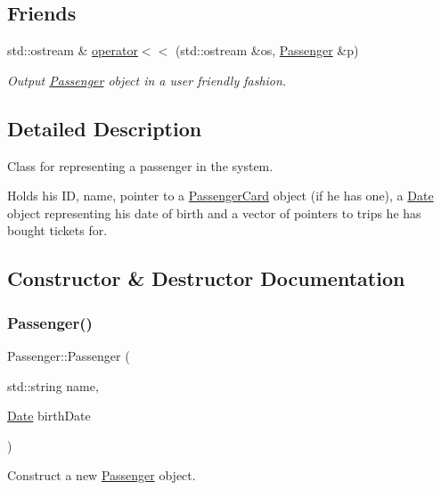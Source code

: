 \subsection*{Friends}
\begin{DoxyCompactItemize}
\item 
std\+::ostream \& \mbox{\hyperlink{classPassenger_a7b1aeaded08562578690b788f39db888}{operator$<$$<$}} (std\+::ostream \&os, \mbox{\hyperlink{classPassenger}{Passenger}} \&p)
\begin{DoxyCompactList}\small\item\em Output \mbox{\hyperlink{classPassenger}{Passenger}} object in a user friendly fashion. \end{DoxyCompactList}\end{DoxyCompactItemize}


\subsection{Detailed Description}
Class for representing a passenger in the system. 

Holds his ID, name, pointer to a \mbox{\hyperlink{classPassengerCard}{Passenger\+Card}} object (if he has one), a \mbox{\hyperlink{classDate}{Date}} object representing his date of birth and a vector of pointers to trips he has bought tickets for. 

\subsection{Constructor \& Destructor Documentation}
\mbox{\label{classPassenger_ac66212e8c1e35bb4423c6e1624ae31d9}} 
\subsubsection{\texorpdfstring{Passenger()}{Passenger()}}
{\footnotesize\ttfamily Passenger\+::\+Passenger (\begin{DoxyParamCaption}\item[{std\+::string}]{name,  }\item[{\mbox{\hyperlink{classDate}{Date}}}]{birth\+Date }\end{DoxyParamCaption})}



Construct a new \mbox{\hyperlink{classPassenger}{Passenger}} object. 


